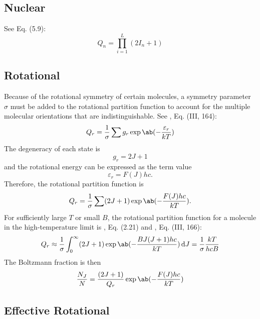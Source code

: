\documentclass[11pt, twoside, fleqn]{report}
\begin{document}
\subsection{Nuclear}

See \cite{hansonSpectroscopyOpticalDiagnostics2016} Eq. (5.9):
\begin{equation*}
    Q_n = \prod_{i = 1}^L (2I_n + 1)
\end{equation*}

\subsection{Rotational}
Because of the rotational symmetry of certain molecules, a symmetry parameter $\sigma$ must be added to the rotational partition function to account for the multiple molecular orientations that are indistinguishable.
See \cite{herzbergMolecularSpectraMolecular1950}, Eq. (III, 164):
\begin{equation*}
    Q_r = \frac{1}{\sigma} \sum g_r\exp\ab(-\frac{\varepsilon_r}{kT})
\end{equation*}
The degeneracy of each state is
\begin{equation*}
    g_r = 2J + 1
\end{equation*}
and the rotational energy can be expressed as the term value
\begin{equation*}
    \varepsilon_r = F(J)hc.
\end{equation*}
Therefore, the rotational partition function is
\begin{equation*}
    Q_r = \frac{1}{\sigma} \sum (2J + 1)\exp\ab(-\frac{F(J)hc}{kT}).
\end{equation*}
For sufficiently large $T$ or small $B$, the rotational partition function for a molecule in the high-temperature limit is \cite{hansonSpectroscopyOpticalDiagnostics2016}, Eq. (2.21) and \cite{herzbergMolecularSpectraMolecular1950}, Eq. (III, 166):
\begin{equation*}
    Q_r \approx \frac{1}{\sigma} \int_0^{\infty} (2J + 1)\exp\ab(-\frac{BJ(J + 1)hc}{kT}) \odif{J} = \frac{1}{\sigma}\frac{kT}{hcB}
\end{equation*}
The Boltzmann fraction is then
\begin{equation*}
    \frac{N_J}{N} = \frac{(2J + 1)}{Q_r}\exp\ab(-\frac{F(J)hc}{kT})
\end{equation*}

\subsection{Effective Rotational}
\end{document}
